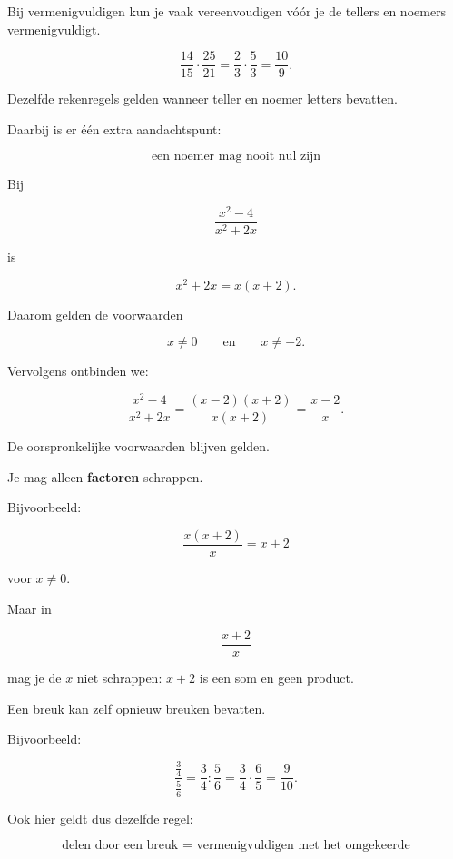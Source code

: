 \documentclass{ximera}
\begin{document}
Bij vermenigvuldigen kun je vaak vereenvoudigen vóór je de tellers en noemers
vermenigvuldigt.

\begin{voorbeeld}
\[
\frac{14}{15}\cdot\frac{25}{21}
=
\frac23\cdot\frac53
=
\frac{10}{9}.
\]
\end{voorbeeld}



Dezelfde rekenregels gelden wanneer teller en noemer letters bevatten.

Daarbij is er één extra aandachtspunt:

\[
\boxed{\text{een noemer mag nooit nul zijn}}
\]

Bij

\[
\frac{x^2-4}{x^2+2x}
\]

is

\[
x^2+2x=x(x+2).
\]

Daarom gelden de voorwaarden

\[
x\neq0
\qquad\text{en}\qquad
x\neq-2.
\]

Vervolgens ontbinden we:

\[
\frac{x^2-4}{x^2+2x}
=
\frac{(x-2)(x+2)}{x(x+2)}
=
\frac{x-2}{x}.
\]

De oorspronkelijke voorwaarden blijven gelden.

\begin{opmerking}
Je mag alleen \textbf{factoren} schrappen.

Bijvoorbeeld:

\[
\frac{x(x+2)}{x}=x+2
\]

voor \(x\neq0\).

Maar in

\[
\frac{x+2}{x}
\]

mag je de \(x\) niet schrappen: \(x+2\) is een som en geen product.
\end{opmerking}



Een breuk kan zelf opnieuw breuken bevatten.

Bijvoorbeeld:

\[
\frac{\frac34}{\frac56}
=
\frac34:\frac56
=
\frac34\cdot\frac65
=
\frac9{10}.
\]

Ook hier geldt dus dezelfde regel:

\[
\boxed{\text{delen door een breuk = vermenigvuldigen met het omgekeerde}}
\]


\end{document}
